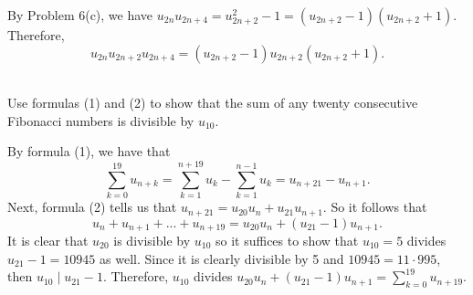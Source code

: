 \begin{solution}
    By Problem 6(c), we have $u_{2n}u_{2n+4} = u_{2n+2}^2 - 1 = (u_{2n+2} - 1)(u_{2n+2} + 1)$. Therefore,
    $$u_{2n}u_{2n+2}u_{2n+4} = (u_{2n+2} - 1)u_{2n+2}(u_{2n+2} + 1).$$ \\
\end{solution}

\begin{exercise}
    Use formulas (1) and (2) to show that the sum of any twenty consecutive Fibonacci numbers is divisible by $u_{10}$. \\
\end{exercise}

\begin{solution}
    By formula (1), we have that
    $$\sum_{k=0}^{19}u_{n+k} = \sum_{k=1}^{n+19}u_k - \sum_{k=1}^{n-1}u_k = u_{n + 21} - u_{n+1}.$$
    Next, formula (2) tells us that $u_{n+21} = u_{20}u_n + u_{21}u_{n+1}$. So it follows that
    $$u_n + u_{n+1} + ... + u_{n+19} = u_{20}u_n + (u_{21} - 1)u_{n+1}.$$
    It is clear that $u_{20}$ is divisible by $u_{10}$ so it suffices to show that $u_{10} = 5$ divides $u_{21} - 1 = 10945$ as well. Since it is clearly divisible by 5 and $10945 = 11\cdot 995$, then $u_{10} \mid u_{21} - 1$. Therefore, $u_{10}$ divides $u_{20}u_n + (u_{21} - 1)u_{n+1} = \sum_{k=0}^{19}u_{n+19}$.  \\
\end{solution}


